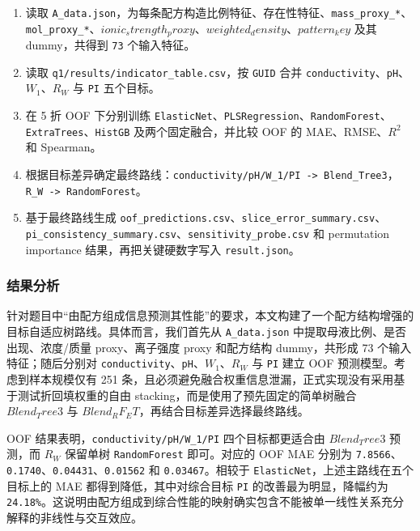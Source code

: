 \documentclass[bwprint]{gmcmthesis}
\numberwithin{figure}{section}
\begin{document}
\begin{enumerate}
\item 读取 \texttt{A\_data.json}，为每条配方构造比例特征、存在性特征、\texttt{mass\_proxy\_*}、\texttt{mol\_proxy\_*}、$ionic_strength_proxy$、$weighted_density$、$pattern_key$ 及其 dummy，共得到 \texttt{73} 个输入特征。
\item 读取 \texttt{q1/results/indicator\_table.csv}，按 \texttt{GUID} 合并 \texttt{conductivity}、\texttt{pH}、$W_1$、$R_W$ 与 \texttt{PI} 五个目标。
\item 在 5 折 OOF 下分别训练 \texttt{ElasticNet}、\texttt{PLSRegression}、\texttt{RandomForest}、\texttt{ExtraTrees}、\texttt{HistGB} 及两个固定融合，并比较 OOF 的 MAE、RMSE、$R^2$ 和 Spearman。
\item 根据目标差异确定最终路线：\texttt{conductivity/pH/W\_1/PI -> Blend\_Tree3}，\texttt{R\_W -> RandomForest}。
\item 基于最终路线生成 \texttt{oof\_predictions.csv}、\texttt{slice\_error\_summary.csv}、\texttt{pi\_consistency\_summary.csv}、\texttt{sensitivity\_probe.csv} 和 permutation importance 结果，再把关键硬数字写入 \texttt{result.json}。
\end{enumerate}

\subsubsection{结果分析}

针对题目中“由配方组成信息预测其性能”的要求，本文构建了一个配方结构增强的目标自适应树路线。具体而言，我们首先从 \texttt{A\_data.json} 中提取母液比例、是否出现、浓度/质量 proxy、离子强度 proxy 和配方结构 dummy，共形成 73 个输入特征；随后分别对 \texttt{conductivity}、\texttt{pH}、$W_1$、$R_W$ 与 \texttt{PI} 建立 OOF 预测模型。考虑到样本规模仅有 251 条，且必须避免融合权重信息泄漏，正式实现没有采用基于测试折回填权重的自由 stacking，而是使用了预先固定的简单树融合 $Blend_Tree3$ 与 $Blend_RF_ET$，再结合目标差异选择最终路线。\par

OOF 结果表明，\texttt{conductivity/pH/W\_1/PI} 四个目标都更适合由 $Blend_Tree3$ 预测，而 $R_W$ 保留单树 \texttt{RandomForest} 即可。对应的 OOF MAE 分别为 \texttt{7.8566}、\texttt{0.1740}、\texttt{0.04431}、\texttt{0.01562} 和 \texttt{0.03467}。相较于 \texttt{ElasticNet}，上述主路线在五个目标上的 MAE 都得到降低，其中对综合目标 \texttt{PI} 的改善最为明显，降幅约为 \texttt{24.18\%}。这说明由配方组成到综合性能的映射确实包含不能被单一线性关系充分解释的非线性与交互效应。\par
\end{document}
